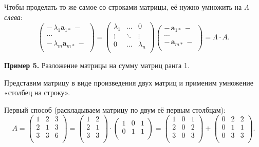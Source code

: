 \documentclass[11pt,a4paper]{article}
\begin{document}
Чтобы проделать то же самое со строками матрицы, её нужно умножить на
\(\Lambda\) \emph{слева}: \[
  \begin{pmatrix}
    -\, \lambda_1 \mathbf{a}_{1*} \,- \\
    \cdots \\
    -\, \lambda_m \mathbf{a}_{m*} \,- \\
  \end{pmatrix}
  =
  \begin{pmatrix}
    \lambda_{1} & \ldots & 0         \\
    \vdots      & \ddots & \vdots    \\
    0           & \ldots & \lambda_n \\
  \end{pmatrix}
  \begin{pmatrix}
    -\, \mathbf{a}_{1*} \,- \\
    \cdots \\
    -\, \mathbf{a}_{m*} \,- \\
  \end{pmatrix}
  = \Lambda \cdot A.
\]

    \textbf{Пример 5.} Разложение матрицы на сумму матриц ранга 1.

Представим матрицу в виде произведения двух матриц и применим умножение
«столбец на строку».

    Первый способ (раскладываем матрицу по двум её первым столбцам): \[
  A = 
  \begin{pmatrix}
     1 & 2 & 3 \\
     2 & 1 & 3 \\
     3 & 3 & 6 \\
  \end{pmatrix}
  =
  \begin{pmatrix}
     1 & 2 \\
     2 & 1 \\
     3 & 3 \\
  \end{pmatrix}
  \cdot
  \begin{pmatrix}
     1 & 0 & 1 \\
     0 & 1 & 1 \\
  \end{pmatrix}
  =
  \begin{pmatrix}
     1 & 0 & 1 \\
     2 & 0 & 2 \\
     3 & 0 & 3 \\
  \end{pmatrix}
  +
  \begin{pmatrix}
     0 & 2 & 2 \\
     0 & 1 & 1 \\
     0 & 3 & 3 \\
  \end{pmatrix}.
\]
\end{document}
